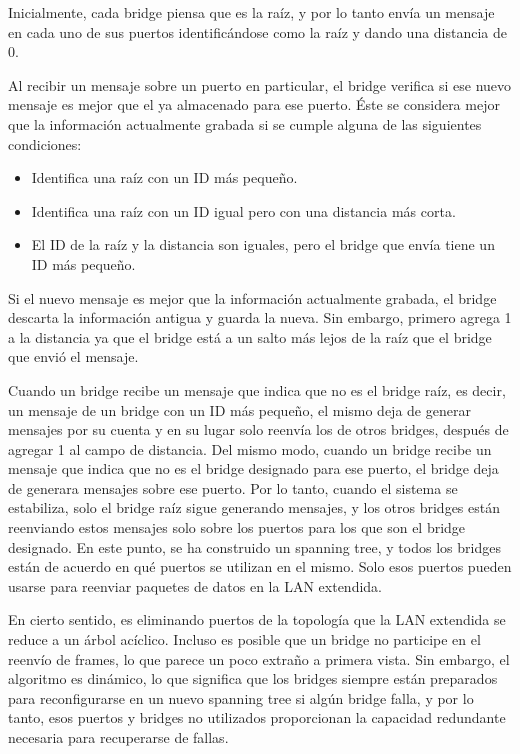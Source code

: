 Inicialmente, cada bridge piensa que es la raíz, y por lo tanto envía un mensaje en cada uno de sus puertos identificándose como la raíz y dando una distancia de 0. 

Al recibir un mensaje sobre un puerto en particular, el bridge verifica si ese nuevo mensaje es mejor que el ya almacenado para ese puerto. Éste se considera mejor que la información actualmente grabada si se cumple alguna de las siguientes condiciones:
\begin{itemize}
  \item Identifica una raíz con un ID más pequeño.
  \item Identifica una raíz con un ID igual pero con una distancia más corta.
  \item El ID de la raíz y la distancia son iguales, pero el bridge que envía tiene un ID más pequeño.
\end{itemize}

Si el nuevo mensaje es mejor que la información actualmente grabada, el bridge descarta la información antigua y guarda la nueva. Sin embargo, primero agrega 1 a la distancia ya que el bridge está a un salto más lejos de la raíz que el bridge que envió el mensaje.

Cuando un bridge recibe un mensaje que indica que no es el bridge raíz, es decir, un mensaje de un bridge con un ID más pequeño, el mismo deja de generar mensajes por su cuenta y en su lugar solo reenvía los de otros bridges, después de agregar 1 al campo de distancia. Del mismo modo, cuando un bridge recibe un mensaje que indica que no es el bridge designado para ese puerto, el bridge deja de generara mensajes sobre ese puerto. Por lo tanto, cuando el sistema se estabiliza, solo el bridge raíz sigue generando mensajes, y los otros bridges están reenviando estos mensajes solo sobre los puertos para los que son el bridge designado. En este punto, se ha construido un spanning tree, y todos los bridges están de acuerdo en qué puertos se utilizan en el mismo. Solo esos puertos pueden usarse para reenviar paquetes de datos en la LAN extendida.

En cierto sentido, es eliminando puertos de la topología que la LAN extendida se reduce a un árbol acíclico. Incluso es posible que un bridge no participe en el reenvío de frames, lo que parece un poco extraño a primera vista. Sin embargo, el algoritmo es dinámico, lo que significa que los bridges siempre están preparados para reconfigurarse en un nuevo spanning tree si algún bridge falla, y por lo tanto, esos puertos y bridges no utilizados proporcionan la capacidad redundante necesaria para recuperarse de fallas.


